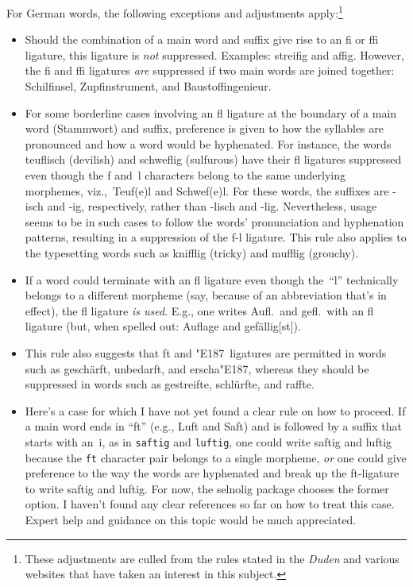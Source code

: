 \documentclass[12pt]{article}
\newcommand{\pkg}[1]{\textsf{#1}}
\newcommand{\opt}[1]{\texttt{#1}}
\begin{document}
For German words, the following exceptions and adjustments apply:\footnote{These adjustments are culled from the rules stated in the \emph{Duden} and  various websites that have taken an interest in this subject.}
\begin{itemize}
\item Should the combination of a main word and suffix give rise to an fi or ffi ligature, this ligature is \emph{not} suppressed. Examples: streifig and affig. However, the fi and ffi ligatures \emph{are} suppressed if two main words are joined together: Schilfinsel, Zupfinstrument, and Baustoffingenieur.

\item For some borderline cases involving an fl ligature at the boundary of a main word (Stammwort) and suffix, preference is given to how the syllables are pronounced and how a word would be hyphenated. For instance, the words teuflisch (devilish) and schweflig (sulfurous) have their fl ligatures suppressed even though the f and~l characters belong to the same underlying morphemes, {viz.},\ Teuf(e)l and Schwef(e)l. For these words, the suffixes are -isch and -ig, respectively, rather than -lisch and -lig. Nevertheless, usage seems to be in such cases to follow the words' pronunciation and hyphenation patterns, resulting in a suppression of the f-l ligature. This rule also applies to the typesetting words such as knifflig (tricky) and mufflig (grouchy).

\item If a word could terminate with an fl ligature even though the~\enquote{l} technically belongs to a different morpheme (say, because of an abbreviation that's in effect), the fl ligature \emph{is used}. E.g., one writes Aufl.\ and gefl.\ with an fl ligature (but, when spelled out: Auflage and gefällig[s\breaklig t]).

\item This rule also suggests that ft and \char"E187\ ligatures are permitted in words such as geschärft, unbedarft, and erscha\char"E187, whereas they should be suppressed in words such as gestreifte, schlürfte, and raffte.

\item Here's a case for which I have not yet found a clear rule on how to proceed. If a main word ends in \enquote{ft} (e.g., Luft and Saft) and is followed by a suffix that starts with an~i, as in \opt{saftig} and \opt{luftig}, one could write saftig and luftig because the \opt{ft} character pair belongs to a single morpheme, \emph{or} one could give preference to the way the words are hyphenated and break up the ft-ligature to write saf\breaklig tig and luf\breaklig tig. For now, the \pkg{selnolig} package chooses the former option. I haven't found any clear references so far on how to treat this case. Expert help and guidance on this topic would be much appreciated.

\end{itemize}
\end{document}
